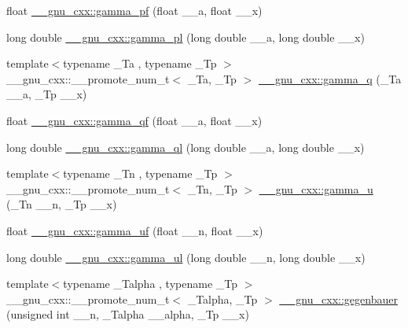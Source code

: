 \begin{DoxyCompactItemize}
\item 
float \hyperlink{group__gnu__math__spec__func_gac9a59be05877d3c14fa95bebcf15e8df}{\+\_\+\+\_\+gnu\+\_\+cxx\+::gamma\+\_\+pf} (float \+\_\+\+\_\+a, float \+\_\+\+\_\+x)
\item 
long double \hyperlink{group__gnu__math__spec__func_gaa37f4adf9942ce8e095f440963b330a6}{\+\_\+\+\_\+gnu\+\_\+cxx\+::gamma\+\_\+pl} (long double \+\_\+\+\_\+a, long double \+\_\+\+\_\+x)
\item 
{\footnotesize template$<$typename \+\_\+\+Ta , typename \+\_\+\+Tp $>$ }\\\+\_\+\+\_\+gnu\+\_\+cxx\+::\+\_\+\+\_\+promote\+\_\+num\+\_\+t$<$ \+\_\+\+Ta, \+\_\+\+Tp $>$ \hyperlink{group__gnu__math__spec__func_ga6f8b617b9cbd4a822ee3328530372c9d}{\+\_\+\+\_\+gnu\+\_\+cxx\+::gamma\+\_\+q} (\+\_\+\+Ta \+\_\+\+\_\+a, \+\_\+\+Tp \+\_\+\+\_\+x)
\item 
float \hyperlink{group__gnu__math__spec__func_ga3ee8d2c40b904952538709cbb0e664a4}{\+\_\+\+\_\+gnu\+\_\+cxx\+::gamma\+\_\+qf} (float \+\_\+\+\_\+a, float \+\_\+\+\_\+x)
\item 
long double \hyperlink{group__gnu__math__spec__func_ga5364a098596681809294d25741539ffc}{\+\_\+\+\_\+gnu\+\_\+cxx\+::gamma\+\_\+ql} (long double \+\_\+\+\_\+a, long double \+\_\+\+\_\+x)
\item 
{\footnotesize template$<$typename \+\_\+\+Tn , typename \+\_\+\+Tp $>$ }\\\+\_\+\+\_\+gnu\+\_\+cxx\+::\+\_\+\+\_\+promote\+\_\+num\+\_\+t$<$ \+\_\+\+Tn, \+\_\+\+Tp $>$ \hyperlink{group__gnu__math__spec__func_ga60911c010897719711d563edf69df44a}{\+\_\+\+\_\+gnu\+\_\+cxx\+::gamma\+\_\+u} (\+\_\+\+Tn \+\_\+\+\_\+n, \+\_\+\+Tp \+\_\+\+\_\+x)
\item 
float \hyperlink{group__gnu__math__spec__func_gaed277602032a21acc09655467482eec9}{\+\_\+\+\_\+gnu\+\_\+cxx\+::gamma\+\_\+uf} (float \+\_\+\+\_\+n, float \+\_\+\+\_\+x)
\item 
long double \hyperlink{group__gnu__math__spec__func_gae2c9ff364ba758f0f41a5b71d2c9e755}{\+\_\+\+\_\+gnu\+\_\+cxx\+::gamma\+\_\+ul} (long double \+\_\+\+\_\+n, long double \+\_\+\+\_\+x)
\item 
{\footnotesize template$<$typename \+\_\+\+Talpha , typename \+\_\+\+Tp $>$ }\\\+\_\+\+\_\+gnu\+\_\+cxx\+::\+\_\+\+\_\+promote\+\_\+num\+\_\+t$<$ \+\_\+\+Talpha, \+\_\+\+Tp $>$ \hyperlink{group__gnu__math__spec__func_gaf295fecea6e26f1caeb7aa1560e9b7ee}{\+\_\+\+\_\+gnu\+\_\+cxx\+::gegenbauer} (unsigned int \+\_\+\+\_\+n, \+\_\+\+Talpha \+\_\+\+\_\+alpha, \+\_\+\+Tp \+\_\+\+\_\+x)

\end{DoxyCompactItemize}
